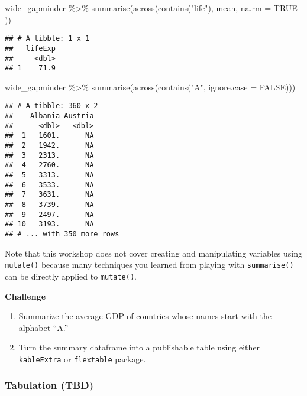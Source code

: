 \documentclass[
]{book}
\newenvironment{Shaded}{\begin{snugshade}}{\end{snugshade}}
\newcommand{\AttributeTok}[1]{\textcolor[rgb]{0.77,0.63,0.00}{#1}}
\newcommand{\ConstantTok}[1]{\textcolor[rgb]{0.00,0.00,0.00}{#1}}
\newcommand{\FunctionTok}[1]{\textcolor[rgb]{0.00,0.00,0.00}{#1}}
\newcommand{\NormalTok}[1]{#1}
\newcommand{\SpecialCharTok}[1]{\textcolor[rgb]{0.00,0.00,0.00}{#1}}
\newcommand{\StringTok}[1]{\textcolor[rgb]{0.31,0.60,0.02}{#1}}
\begin{document}
\begin{Shaded}
\begin{Highlighting}[]
\NormalTok{wide\_gapminder }\SpecialCharTok{\%\textgreater{}\%}
  \FunctionTok{summarise}\NormalTok{(}\FunctionTok{across}\NormalTok{(}\FunctionTok{contains}\NormalTok{(}\StringTok{"life"}\NormalTok{),}
\NormalTok{    mean,}
    \AttributeTok{na.rm =} \ConstantTok{TRUE}
\NormalTok{  ))}
\end{Highlighting}
\end{Shaded}

\begin{verbatim}
## # A tibble: 1 x 1
##   lifeExp
##     <dbl>
## 1    71.9
\end{verbatim}

\begin{Shaded}
\begin{Highlighting}[]
\NormalTok{wide\_gapminder }\SpecialCharTok{\%\textgreater{}\%}
  \FunctionTok{summarise}\NormalTok{(}\FunctionTok{across}\NormalTok{(}\FunctionTok{contains}\NormalTok{(}\StringTok{"A"}\NormalTok{, }\AttributeTok{ignore.case =} \ConstantTok{FALSE}\NormalTok{)))}
\end{Highlighting}
\end{Shaded}

\begin{verbatim}
## # A tibble: 360 x 2
##    Albania Austria
##      <dbl>   <dbl>
##  1   1601.      NA
##  2   1942.      NA
##  3   2313.      NA
##  4   2760.      NA
##  5   3313.      NA
##  6   3533.      NA
##  7   3631.      NA
##  8   3739.      NA
##  9   2497.      NA
## 10   3193.      NA
## # ... with 350 more rows
\end{verbatim}

Note that this workshop does not cover creating and manipulating variables using \texttt{mutate()} because many techniques you learned from playing with \texttt{summarise()} can be directly applied to \texttt{mutate()}.

\textbf{Challenge}

\begin{enumerate}
\def\labelenumi{\arabic{enumi}.}
\item
  Summarize the average GDP of countries whose names start with the alphabet ``A.''
\item
  Turn the summary dataframe into a publishable table using either \texttt{kableExtra} or \texttt{flextable} package.
\end{enumerate}

\hypertarget{tabulation-tbd}{%
\subsubsection{Tabulation (TBD)}\label{tabulation-tbd}}
\end{document}
